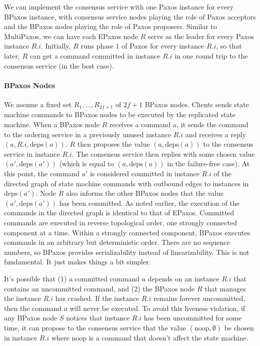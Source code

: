 \documentclass{mwhittaker}
\theoremstyle{definition}
\newcommand{\deps}[1]{\text{deps}(#1)}
\begin{document}
We can implement the consensus service with one Paxos instance for every BPaxos
instance, with consensus service nodes playing the role of Paxos acceptors and
the BPaxos nodes playing the role of Paxos proposers. Similar to MultiPaxos, we
can have each EPaxos node $R$ serve as the leader for every Paxos instance
$R.i$. Initially, $R$ runs phase 1 of Paxos for every instance $R.i$, so that
later, $R$ can get a command committed in instance $R.i$ in one round trip to
the consensus service (in the best case).

\paragraph{BPaxos Nodes}
We assume a fixed set $R_1, \ldots, R_{2f+1}$ of $2f + 1$ BPaxos nodes.
%
Clients sends state machine commands to BPaxos nodes to be executed by the
replicated state machine. When a BPaxos node $R$ receives a command $a$, it
sends the command to the ordering service in a previously unused instance $R.i$
and receives a reply $(a, R.i, \deps{a})$. $R$ then proposes the value $(a,
\deps{a})$ to the consensus service in instance $R.i$. The consensus service
then replies with some chosen value $(a', \deps{a'})$ (which is equal to $(a,
\deps{a})$ in the failure-free case). At this point, the command $a'$ is
considered committed in instance $R.i$ of the directed graph of state machine
commands with outbound edges to instances in $\deps{a'}$. Node $R$ also informs
the other BPaxos nodes that the value $(a', \deps{a'})$ has been committed. As
noted earlier, the execution of the commands in the directed graph is identical
to that of EPaxos. Committed commands are executed in reverse topological
order, one strongly connected component at a time. Within a strongly connected
component, BPaxos executes commands in an arbitrary but deterministic order.
There are no sequence numbers, so BPaxos provides serializability instead of
linearizability. This is not fundamental. It just makes things a bit simpler.

\newcommand{\noop}{\text{noop}}
It's possible that (1) a committed command $a$ depends on an instance $R.i$
that contains an uncommitted command, and (2) the BPaxos node $R$ that manages
the instance $R.i$ has crashed. If the instance $R.i$ remains forever
uncommitted, then the command $a$ will never be executed. To avoid this
liveness violation, if any BPaxos node $S$ notices that instance $R.i$ has been
uncommitted for some time, it can propose to the consensus service that the
value $(\noop, \emptyset)$ be chosen in instance $R.i$ where $\noop$ is a
command that doesn't affect the state machine.
\end{document}
